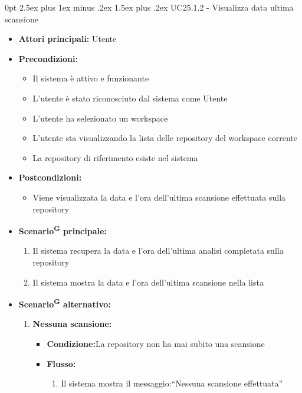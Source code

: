 \documentclass[a4paper, 11pt]{article}
\makeatletter
\renewcommand\paragraph{\@startsection{paragraph}{4}
  {0pt}
  {2.5ex plus 1ex minus .2ex}
  {1.5ex plus .2ex}
  {\normalfont\normalsize\bfseries\color{AccentDark}}}
\makeatother
\begin{document}
\paragraph{UC25.1.2 - Visualizza data ultima scansione} \label{UC25.1.2}
\begin{itemize}
	\item \textbf{Attori principali:} Utente
	\item \textbf{Precondizioni:} 
	\begin{itemize}
		\item Il sistema è attivo e funzionante
		\item L'utente è stato riconosciuto dal sistema come Utente
		\item L'utente ha selezionato un workspace 
		\item L'utente sta visualizzando la lista delle repository del workspace corrente
		\item La repository di riferimento esiste nel sistema
	\end{itemize}
	\item \textbf{Postcondizioni:} 
	\begin{itemize}
		\item Viene visualizzata la data e l'ora dell'ultima scansione effettuata sulla repository
	\end{itemize}
	\item \textbf{Scenario\textsuperscript{G} principale:}
	\begin{enumerate}
		\item Il sistema recupera la data e l'ora dell'ultima analisi completata sulla repository
		\item Il sistema mostra la data e l'ora dell'ultima scansione nella lista
	\end{enumerate}
	\item \textbf{Scenario\textsuperscript{G} alternativo:}
	\begin{enumerate}
		\item \textbf{Nessuna scansione:} 
			\begin{itemize}
				\item \textbf{Condizione:}La repository non ha mai subito una scansione
				\item \textbf{Flusso:} 
				\begin{enumerate}
					\item Il sistema mostra il messaggio:“Nessuna scansione effettuata”
				\end{enumerate}
			\end{itemize}
	\end{enumerate}
\end{itemize}
\end{document}
